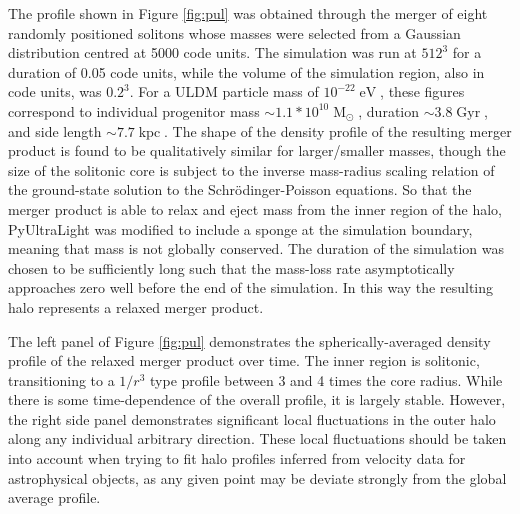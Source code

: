 \documentclass[a4paper,11pt]{article}
\begin{document}
The profile shown in Figure \ref{fig:pul} was obtained through the merger of eight randomly positioned solitons whose masses were selected from a Gaussian distribution centred at 5000 code units. The simulation was run at $512^3$ for a duration of 0.05 code units, while the volume of the simulation region, also in code units, was $0.2^3$. For a ULDM particle mass of $10^{-22}\operatorname{eV}$, these figures correspond to individual progenitor mass $\sim 1.1*10^{10}\operatorname{M}_{\odot}$, duration $\sim 3.8 \operatorname{Gyr}$, and side length $\sim 7.7 \operatorname{kpc}$. The shape of the density profile of the resulting merger product is found to be qualitatively similar for larger/smaller masses, though the size of the solitonic core is subject to the inverse mass-radius scaling relation of the ground-state solution to the Schr{\"o}dinger-Poisson equations. So that the merger product is able to relax and eject mass from the inner region of the halo, PyUltraLight was modified to include a sponge at the simulation boundary, meaning that mass is not globally conserved. The duration of the simulation was chosen to be sufficiently long such that the mass-loss rate asymptotically approaches zero well before the end of the simulation. In this way the resulting halo represents a relaxed merger product. 

The left panel of Figure \ref{fig:pul} demonstrates the spherically-averaged density profile of the relaxed merger product over time. The inner region is solitonic, transitioning to a $1/r^3$ type profile between 3 and 4 times the core radius. While there is some time-dependence of the overall profile, it is largely stable. However, the right side panel demonstrates significant local fluctuations in the outer halo along any individual arbitrary direction. These local fluctuations should be taken into account when trying to fit halo profiles inferred from velocity data for astrophysical objects, as any given point may be deviate strongly from the global average profile. 
\end{document}
